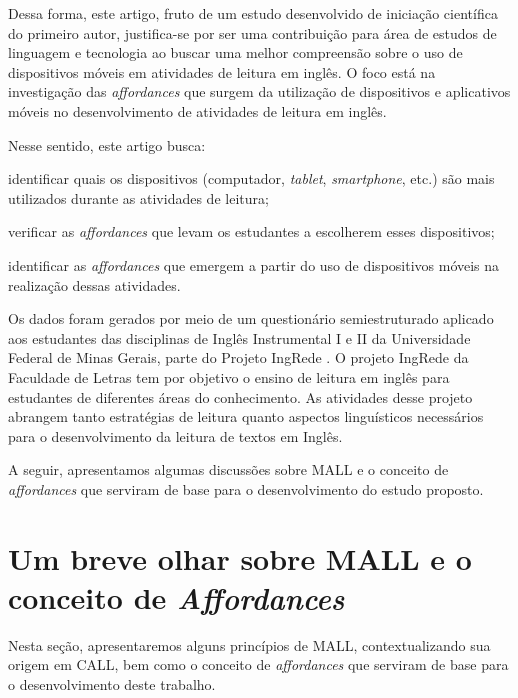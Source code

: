 \documentclass[portuguese]{textolivre}
\begin{document}
Dessa forma, este artigo, fruto de um estudo desenvolvido de iniciação científica do primeiro autor, justifica-se por ser uma contribuição para área de estudos de linguagem e tecnologia ao buscar uma melhor compreensão sobre o uso de dispositivos móveis em atividades de leitura em inglês. O foco está na investigação das \emph{affordances} que surgem da utilização de dispositivos e aplicativos móveis no desenvolvimento de atividades de leitura em inglês.

Nesse sentido, este artigo busca:
\begin {enumerate*}
\item identificar quais os dispositivos (computador, \emph{tablet}, \emph{smartphone}, etc.) são mais utilizados durante as atividades de leitura; 
\item verificar as \emph{affordances} que levam os estudantes a escolherem esses dispositivos;
\item identificar as \emph{affordances} que emergem a partir do uso de dispositivos móveis na realização dessas atividades.
\end{enumerate*}

Os dados foram gerados por meio de um questionário semiestruturado aplicado aos estudantes das disciplinas de Inglês Instrumental I e II da Universidade Federal de Minas Gerais, parte do Projeto IngRede \cite{projetoin}. O projeto IngRede da Faculdade de Letras tem por objetivo o ensino de leitura em inglês para estudantes de diferentes áreas do conhecimento. As atividades desse projeto abrangem tanto estratégias de leitura quanto aspectos linguísticos necessários para o desenvolvimento da leitura de textos em Inglês.

A seguir, apresentamos algumas discussões sobre MALL e  o conceito de \emph{affordances} que serviram de base para o desenvolvimento do estudo proposto.



\section{Um breve olhar sobre  MALL e o conceito de \emph{Affordances}}

Nesta seção, apresentaremos alguns princípios de MALL, contextualizando sua origem em CALL, bem como o conceito de \emph{
affordances} que serviram de base para o desenvolvimento deste trabalho.
\end{document}
